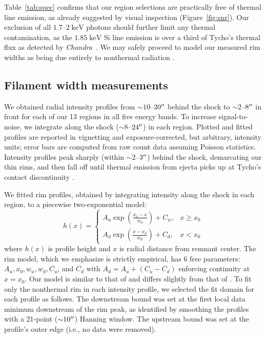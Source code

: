 \documentclass[iop, apj, numberedappendix, twocolappendix]{emulateapj}
\newcommand*{\mt}{\mathrm}
\newcommand*{\unit}[1]{\;\mt{#1}}  %
\newcommand*{\abt}{\mathord{\sim}} %
\newcommand*{\Chandra}{\textit{Chandra}\ }
\begin{document}
Table~\ref{tab:spec} confirms that our region selections are practically free
of thermal line emission, as already suggested by visual inspection
(Figure~\ref{fig:snr}).  Our exclusion of all $1.7$--$2
\unit{keV}$ photons should further limit any thermal contamination, as
the $1.85 \unit{keV}$ Si line emission is over a third of Tycho's thermal flux
as detected by \Chandra \citep{hwang2002}.  We may safely proceed to model our
measured rim widths as being due entirely to nonthermal radiation
.

\subsection{Filament width measurements}
\label{sec:fwhms}

We obtained radial intensity profiles from $\abt 10$--$20\mbox{$^{\prime\prime}$}$ behind the
shock to $\abt 2$--$8\mbox{$^{\prime\prime}$}$ in front for each of our 13 regions in all five
energy bands.  To increase signal-to-noise, we integrate along the shock ($\abt
8$--$24\mbox{$^{\prime\prime}$}$) in each region.  Plotted and fitted profiles are reported in
vignetting and exposure-corrected, but arbitrary, intensity units; error bars
are computed from raw count data assuming Poisson statistics.  Intensity
profiles peak sharply (within $\abt 2$--$3\mbox{$^{\prime\prime}$}$) behind the shock,
demarcating our thin rims, and then fall off until thermal emission from ejecta
picks up at Tycho's contact discontinuity \citep{warren2005}.

We fitted rim profiles, obtained by integrating intensity along the shock in
each region, to a piecewise two-exponential model:
\begin{equation} \label{eq:prof}
    h(x) =
    \begin{cases}
        A_u \exp \left(\frac{x_0 - x}{w_u}\right) + C_u, &x \geq x_0 \\
        A_d \exp \left(\frac{x - x_0}{w_d}\right) + C_d, &x < x_0
    \end{cases}
\end{equation}
where $h(x)$ is profile height and $x$ is radial distance from remnant center.
The rim model, which we emphasize is strictly empirical, has 6 free parameters:
$A_u, x_0, w_u, w_d, C_u$, and $C_d$ with $A_d = A_u + (C_u - C_d)$ enforcing
continuity at $x=x_0$. Our model is similar to that of \citet{bamba2003,
bamba2005-hist} and differs slightly from that of .
To fit only the nonthermal rim in each intensity profile, we selected the fit
domain for each profile as follows.  The downstream bound was set at the first
local data minimum downstream of the rim peak, as identified by smoothing the
profiles with a 21-point ($\abt 10\arcsec$) Hanning window.  The upstream bound
was set at the profile's outer edge (i.e., no data were removed).
\end{document}
